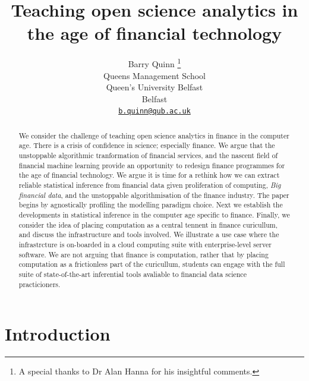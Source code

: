 \documentclass{article}
\title{Teaching open science analytics in the age of financial
technology}
\author{
    Barry Quinn
    \thanks{A special thanks to Dr Alan Hanna for his insightful
comments.}
   \\
    Queens Management School \\
    Queen's University Belfast \\
  Belfast \\
  \texttt{\href{mailto:b.quinn@qub.ac.uk}{\nolinkurl{b.quinn@qub.ac.uk}}} \\
  }
\begin{document}
\maketitle

\def\tightlist{}


\begin{abstract}
We consider the challenge of teaching open science analytics in finance
in the computer age. There is a crisis of confidence in science;
especially finance. We argue that the unstoppable algorithmic
tranformation of financial services, and the nascent field of financial
machine learning provide an opportunity to redesign finance programmes
for the age of financial technology. We argue it is time for a rethink
how we can extract reliable statistical inference from financial data
given proliferation of computing, \emph{Big financial data}, and the
unstoppable algorithmisation of the finance industry. The paper begins
by agnostically profiling the modelling paradigm choice. Next we
establish the developments in statistical inference in the computer age
specific to finance. Finally, we consider the idea of placing
computation as a central tennent in finance curicullum, and discuss the
infrastructure and tools involved. We illustrate a use case where the
infrastrcture is on-boarded in a cloud computing suite with
enterprise-level server software. We are not arguing that finance is
computation, rather that by placing computation as a frictionless part
of the curicullum, students can engage with the full suite of
state-of-the-art inferential tools avaliable to financial data science
practicioners.
\end{abstract}


\hypertarget{introduction}{%
\section{Introduction}\label{introduction}}
\end{document}
